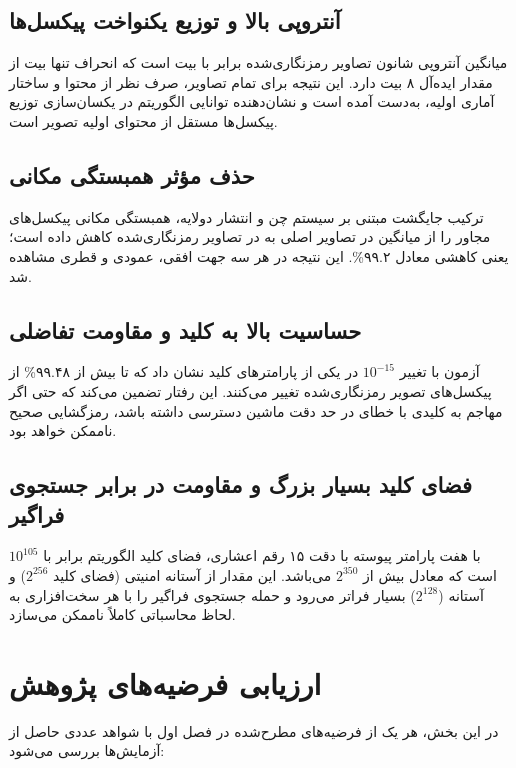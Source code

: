 \subsection{آنتروپی بالا و توزیع یکنواخت پیکسل‌ها}

میانگین آنتروپی شانون تصاویر رمزنگاری‌شده برابر با  بیت است که انحراف تنها  بیت از مقدار ایده‌آل ۸ بیت دارد. این نتیجه برای تمام تصاویر، صرف نظر از محتوا و ساختار آماری اولیه، به‌دست آمده است و نشان‌دهنده توانایی الگوریتم در یکسان‌سازی توزیع پیکسل‌ها مستقل از محتوای اولیه تصویر است.

\subsection{حذف مؤثر همبستگی مکانی}

ترکیب جایگشت مبتنی بر سیستم چن و انتشار  دولایه، همبستگی مکانی پیکسل‌های مجاور را از میانگین  در تصاویر اصلی به  در تصاویر رمزنگاری‌شده کاهش داده است؛ یعنی کاهشی معادل ۹۹.۲\%. این نتیجه در هر سه جهت افقی، عمودی و قطری مشاهده شد.

\subsection{حساسیت بالا به کلید و مقاومت تفاضلی}

آزمون  با تغییر $10^{-15}$ در یکی از پارامترهای کلید نشان داد که تا بیش از ۹۹.۴۸\% از پیکسل‌های تصویر رمزنگاری‌شده تغییر می‌کنند. این رفتار تضمین می‌کند که حتی اگر مهاجم به کلیدی با خطای در حد دقت ماشین دسترسی داشته باشد، رمزگشایی صحیح ناممکن خواهد بود.

\subsection{فضای کلید بسیار بزرگ و مقاومت در برابر جستجوی فراگیر}

با هفت پارامتر پیوسته با دقت ۱۵ رقم اعشاری، فضای کلید الگوریتم برابر با $10^{105}$ است که معادل بیش از $2^{350}$ می‌باشد. این مقدار از آستانه امنیتی  (فضای کلید $2^{256}$) و آستانه  ($2^{128}$) بسیار فراتر می‌رود و حمله جستجوی فراگیر را با هر سخت‌افزاری به لحاظ محاسباتی کاملاً ناممکن می‌سازد.

\section{ارزیابی فرضیه‌های پژوهش}

در این بخش، هر یک از فرضیه‌های مطرح‌شده در فصل اول با شواهد عددی حاصل از آزمایش‌ها بررسی می‌شود:

